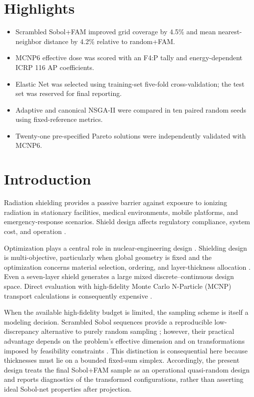 \documentclass[preprint,12pt]{elsarticle}
\begin{document}
\section*{Highlights}
\begin{itemize}
\item Scrambled Sobol+FAM improved grid coverage by 4.5\% and mean nearest-neighbor distance by 4.2\% relative to random+FAM.
\item MCNP6 effective dose was scored with an F4:P tally and energy-dependent ICRP 116 AP coefficients.
\item Elastic Net was selected using training-set five-fold cross-validation; the test set was reserved for final reporting.
\item Adaptive and canonical NSGA-II were compared in ten paired random seeds using fixed-reference metrics.
\item Twenty-one pre-specified Pareto solutions were independently validated with MCNP6.
\end{itemize}

\section{Introduction}
Radiation shielding provides a passive barrier against exposure to ionizing radiation in stationary facilities, medical environments, mobile platforms, and emergency-response scenarios. Shield design affects regulatory compliance, system cost, and operation \citep{Shultis2016}.

Optimization plays a central role in nuclear-engineering design \citep{Price2022}. Shielding design is multi-objective, particularly when global geometry is fixed and the optimization concerns material selection, ordering, and layer-thickness allocation \citep{Bagheri2023,Liu2026}. Even a seven-layer shield generates a large mixed discrete--continuous design space. Direct evaluation with high-fidelity Monte Carlo N-Particle (MCNP) transport calculations is consequently expensive \citep{Werner2017}.

When the available high-fidelity budget is limited, the sampling scheme is itself a modeling decision. Scrambled Sobol sequences provide a reproducible low-discrepancy alternative to purely random sampling \citep{Sobol1967,Owen1997,JoeKuo2008}; however, their practical advantage depends on the problem's effective dimension and on transformations imposed by feasibility constraints \citep{Kucherenko2011,Renardy2021}. This distinction is consequential here because thicknesses must lie on a bounded fixed-sum simplex. Accordingly, the present design treats the final Sobol+FAM sample as an operational quasi-random design and reports diagnostics of the transformed configurations, rather than asserting ideal Sobol-net properties after projection.
\end{document}
